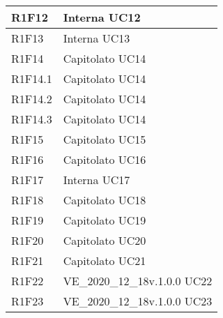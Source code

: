 \begin{center}
\begin{longtable}{|p{22mm}|p{44mm}|}
		R1F12 &
		Interna \newline
		UC12 
		\\
		\hline
		
		R1F13 &
		Interna \newline
		UC13 
		\\
		\hline
		
		R1F14 &
		Capitolato \newline
		UC14 
		\\
		\hline
		
		R1F14.1 &
		Capitolato \newline
		UC14 
		\\
		\hline
		
		R1F14.2 &
		Capitolato \newline
		UC14 
		\\
		\hline
		
		R1F14.3 &
		Capitolato \newline
		UC14 
		\\
		\hline
		
		R1F15 &
		Capitolato \newline
		UC15 
		\\
		\hline
		
		R1F16 &
		Capitolato \newline
		UC16 
		\\
		\hline
		
		R1F17 &
		Interna \newline
		UC17 
		\\
		\hline
		
		R1F18 &
		Capitolato \newline
		UC18 
		\\
		\hline
		
		R1F19 &
		Capitolato \newline
		UC19 
		\\
		\hline
		
		R1F20 &
		Capitolato \newline
		UC20 
		\\
		\hline
		
		R1F21 &
		Capitolato \newline
		UC21 
		\\
		\hline
		
		R1F22 &
		VE\_2020\_12\_18v.1.0.0 \newline
		UC22 
		\\
		\hline
		
		R1F23 &
		VE\_2020\_12\_18v.1.0.0 \newline
		UC23 
		\\
		\hline
		

\end{longtable}
\end{center}
